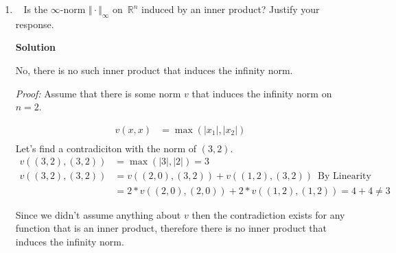 \documentclass[11pt]{article}
\newcommand\score[1]{\marginpar{\vspace{-2ex}\color{blue}{#1/14}}\hspace{-1ex}}
\newcommand\0{\mathbf{0}}
\newcommand\RR{\mathbb{R}}
\newcommand\GL{\mathrm{GL}}
\newcommand\<{\langle}
\renewcommand\>{\rangle}
\begin{document}
\begin{enumerate}
Why is this true? Because multiplicaiton by $R_d^e$ from the right maintains the subspace of the 
left $d$ columns and the left $e$ columns, as well, therefore $V_d$ and $V_e$ stay constant, where 
$V_d$ is the span of the first $d$ columns and $V_e$ is the span of the first $e$ columns. So you can make 
a bijection between the set of chains and the set of cosets of $R_d^e$ in $\GL_n(F)$, because each coset 
only describes one chain and each chain can be described by a coset.

From the last homework we know that the number of invertible matrices 
of size $n$ in a finite field of size $q$ are $\prod_{i=0}^{n-1} (q^n - q^i)$. So we get
$\frac{\prod_{i=0}^{n-1} (q^n - q^i)}{\prod_{i=0}^{d-1} (q^d - q^i) \cdot \prod_{i=0}^{e-d-1} (q^{e-d} - q^i) \cdot \prod_{i=0}^{n-e-1} (q^{n-e} - q^i)}$.
\pagebreak

\item\ \score{}%
Is the $\infty$-norm $\Vert \cdot \Vert_\infty$ on~$\RR^n$ induced by
an inner product?  Justify your response.

\textbf{Solution}

No, there is no such inner product that induces the infinity norm.

\textit{Proof:} Assume that there is some norm $v$ that induces the infinity norm on $n=2$.

\begin{align*}
    v(x,x) &= \max(|x_1|, |x_2|)\\
\end{align*}
Let's find a contradiciton with the norm of $(3,2)$.
\begin{align*}
    v((3,2),(3,2)) &= \max(|3|, |2|) = 3\\
    v((3,2),(3,2)) &= v((2,0),(3,2)) + v((1,2),(3,2)) \; \: \text{By Linearity} \\
    &= 2*v((2,0),(2,0)) + 2*v((1,2),(1,2)) = 4 + 4 \neq 3  \; \: 
\end{align*}

Since we didn't assume anything about $v$ then the contradiction exists for any function that 
is an inner product, therefore there is no inner product that induces the infinity norm.
\end{enumerate}
\end{document}
